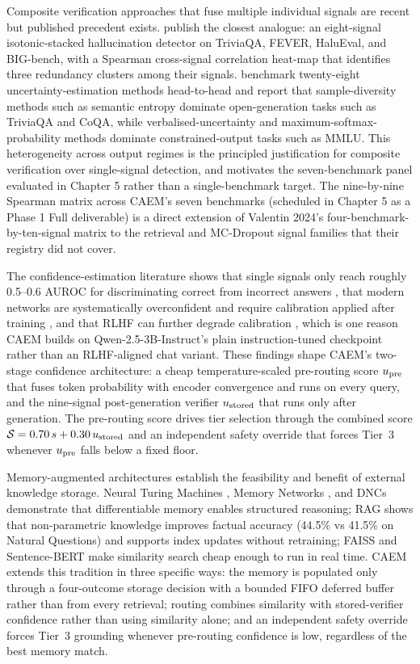 Composite verification approaches that fuse multiple individual signals are recent but published precedent exists. \citet{valentin2024hallucination} publish the closest analogue: an eight-signal isotonic-stacked hallucination detector on TriviaQA, FEVER, HaluEval, and BIG-bench, with a Spearman cross-signal correlation heat-map that identifies three redundancy clusters among their signals. \citet{vashurin2024polygraph} benchmark twenty-eight uncertainty-estimation methods head-to-head and report that sample-diversity methods such as semantic entropy dominate open-generation tasks such as TriviaQA and CoQA, while verbalised-uncertainty and maximum-softmax-probability methods dominate constrained-output tasks such as MMLU. This heterogeneity across output regimes is the principled justification for composite verification over single-signal detection, and motivates the seven-benchmark panel evaluated in Chapter 5 rather than a single-benchmark target. The nine-by-nine Spearman matrix across CAEM's seven benchmarks (scheduled in Chapter 5 as a Phase 1 Full deliverable) is a direct extension of Valentin 2024's four-benchmark-by-ten-signal matrix to the retrieval and MC-Dropout signal families that their registry did not cover.

The confidence-estimation literature shows that single signals only reach roughly 0.5--0.6 AUROC for discriminating correct from incorrect answers \cite{xiong2023can}, that modern networks are systematically overconfident and require calibration applied after training \cite{pmlr-v70-guo17a}, and that RLHF can further degrade calibration \cite{kadavath2022language}, which is one reason CAEM builds on Qwen-2.5-3B-Instruct's plain instruction-tuned checkpoint rather than an RLHF-aligned chat variant. These findings shape CAEM's two-stage confidence architecture: a cheap temperature-scaled pre-routing score $u_{\text{pre}}$ that fuses token probability with encoder convergence and runs on every query, and the nine-signal post-generation verifier $u_{\text{stored}}$ that runs only after generation. The pre-routing score drives tier selection through the combined score $\mathcal{S} = 0.70\,s + 0.30\,u_{\text{stored}}$ and an independent safety override that forces Tier~3 whenever $u_{\text{pre}}$ falls below a fixed floor.

Memory-augmented architectures establish the feasibility and benefit of external knowledge storage. Neural Turing Machines \cite{graves2014neural}, Memory Networks \cite{weston2015memory}, and DNCs \cite{graves2016differentiable} demonstrate that differentiable memory enables structured reasoning; RAG \cite{NEURIPS2020_6b493230} shows that non-parametric knowledge improves factual accuracy (44.5\% vs 41.5\% on Natural Questions) and supports index updates without retraining; FAISS \cite{8733051} and Sentence-BERT \cite{reimers-gurevych-2019-sentence} make similarity search cheap enough to run in real time. CAEM extends this tradition in three specific ways: the memory is populated only through a four-outcome storage decision with a bounded FIFO deferred buffer rather than from every retrieval; routing combines similarity with stored-verifier confidence rather than using similarity alone; and an independent safety override forces Tier~3 grounding whenever pre-routing confidence is low, regardless of the best memory match.

